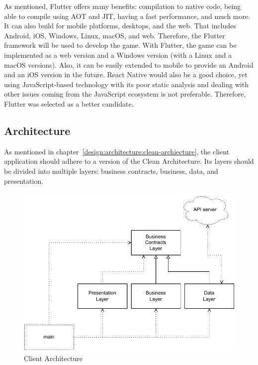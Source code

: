 
As mentioned, Flutter offers many benefits: compilation to native code, being able to compile using AOT and JIT, having a fast performance, and much more.
It can also build for mobile platforms, desktops, and the web.
That includes Android, iOS, Windows, Linux, macOS, and web.
Therefore, the Flutter framework will be used to develop the game.
With Flutter, the game can be implemented as a web version and a Windows version (with a Linux and a macOS versions).
Also, it can be easily extended to mobile to provide an Android and an iOS version in the future.
React Native would also be a good choice, yet using JavaScript-based technology with its poor static analysis and dealing with other issues coming from the JavaScript ecosystem is not preferable.
Therefore, Flutter was selected as a better candidate.

\subsection{Architecture}

As mentioned in chapter~\ref{design:architecture:clean-archiecture}, the client application should adhere to a version of the Clean Architecture.
Its layers should be divided into multiple layers: business contracts, business, data, and presentation.

\begin{figure}
    \centering
    \includegraphics[width=1\linewidth]{assets/design/clientarchitecture.pdf}
    \caption{Client Architecture}
    \label{fig:design:clientarchitecture}
\end{figure}

